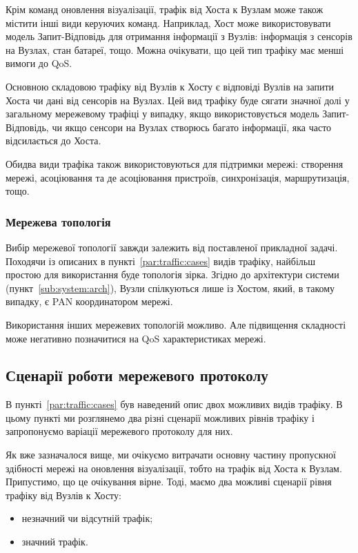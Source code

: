 \documentclass[a4paper,ukrainian,utf8,nocolumnsxix,floatsection,equationsection]{eskdtext}
\renewcommand\paragraph{\subsubsection}
\begin{document}
Крім команд оновлення візуалізації, трафік від Хоста к Вузлам може також містити інші види керуючих команд. Наприклад, Хост може використовувати модель Запит-Відповідь для отримання інформації з Вузлів: інформація з сенсорів на Вузлах, стан батареї, тощо. Можна очікувати, що цей тип трафіку має менші вимоги до QoS.

Основною складовою трафіку від Вузлів к Хосту є відповіді Вузлів на запити Хоста чи дані від сенсорів на Вузлах. Цей вид трафіку буде сягати значної долі у загальному мережевому трафіці у випадку, якщо використовується модель Запит-Відповідь, чи якщо сенсори на Вузлах створюсь багато інформації, яка часто відсилається до Хоста.

Обидва види трафіка також використовуються для підтримки мережі: створення мережі, асоціювання та де асоціювання пристроїв, синхронізація, маршрутизація, тощо.

\paragraph{Мережева топологія}

Вибір мережевої топології завжди залежить від поставленої прикладної задачі. Походячи із описаних в пункті~\ref{par:traffic:cases} видів трафіку, найбільш простою для використання буде топологія зірка. Згідно до архітектури системи (пункт~\ref{sub:system:arch}), Вузли спілкуються лише із Хостом, який, в такому випадку, є PAN координатором мережі.

Використання інших мережевих топологій можливо. Але підвищення складності може негативно позначитися на QoS характеристиках мережі.

\subsection{Сценарії роботи мережевого протоколу}
\label{sub:network:protocol:scenarios}

В пункті~\ref{par:traffic:cases} був наведений опис двох можливих видів трафіку. В цьому пункті ми розглянемо два різні сценарії можливих рівнів трафіку і запропонуємо варіації мережевого протоколу для них.

Як вже зазначалося вище, ми очікуємо витрачати основну частину пропускної здібності мережі на оновлення візуалізації, тобто на трафік від Хоста к Вузлам. Припустимо, що це очікування вірне. Тоді, маємо два можливі сценарії рівня трафіку від Вузлів к Хосту:
\begin{itemize}
	\item незначний чи відсутній трафік;
	\item значний трафік.
\end{itemize}
\end{document}
